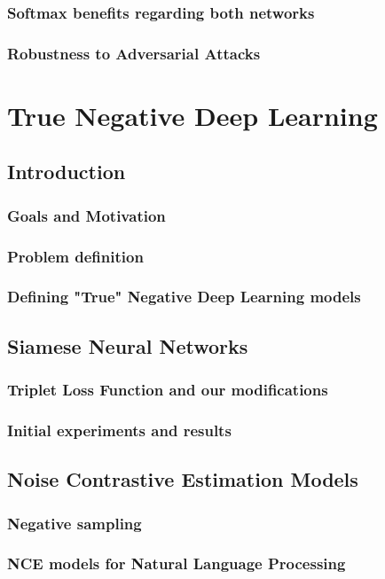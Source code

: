 \documentclass[b5paper]{book}
\begin{document}
\section{Softmax benefits regarding both networks}
\section{Robustness to Adversarial Attacks}

\part{True Negative Deep Learning}
\chapter{Introduction}
\section{Goals and Motivation}
\section{Problem definition}

\section{Defining "True" Negative Deep Learning models}

\chapter{Siamese Neural Networks}
\section{Triplet Loss Function and our modifications}
\section{Initial experiments and results}

\chapter{Noise Contrastive Estimation Models}
\section{Negative sampling}
\section{NCE models for Natural Language Processing}
\end{document}
